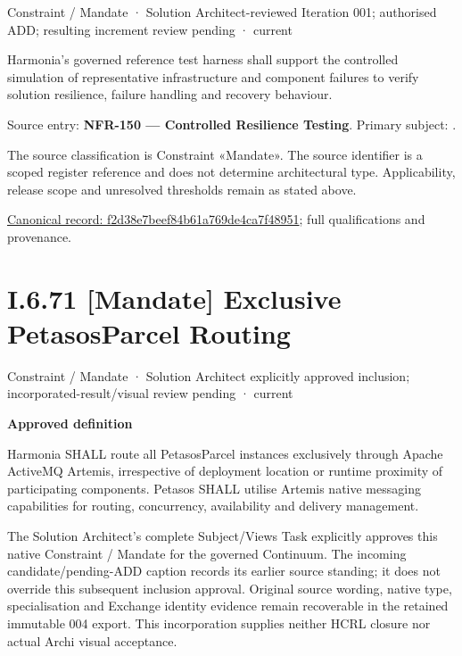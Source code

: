 \label{element:f2d38e7beef84b61a769de4ca7f48951}
{\small Constraint / Mandate · Solution Architect-reviewed Iteration 001; authorised ADD; resulting increment review pending · current}\par

Harmonia's governed reference test harness shall support the controlled simulation of representative infrastructure and component failures to verify solution resilience, failure handling and recovery behaviour.



Source entry: \textbf{NFR-150 — Controlled Resilience Testing}. Primary subject: \texttt{}.



The source classification is Constraint «Mandate». The source identifier is a scoped register reference and does not determine architectural type. Applicability, release scope and unresolved thresholds remain as stated above.


{\footnotesize \href{../../../../../../../continuum/motivation/constraint/mandate/f2d38e7beef84b61a769de4ca7f48951.md}{Canonical record: f2d38e7beef84b61a769de4ca7f48951}; full qualifications and provenance.}\par
\section*{I.6.71 [Mandate] Exclusive PetasosParcel Routing}
\label{navigation:I.6.71}

\label{element:e024703b32c5437481ce290e8e50b079}
{\small Constraint / Mandate · Solution Architect explicitly approved inclusion; incorporated-result/visual review pending · current}\par

\par\medskip\textbf{Approved definition}\par


Harmonia SHALL route all PetasosParcel instances exclusively through Apache ActiveMQ Artemis, irrespective of deployment location or runtime proximity of participating components. Petasos SHALL utilise Artemis native messaging capabilities for routing, concurrency, availability and delivery management.



The Solution Architect's complete Subject/Views Task explicitly approves this
native Constraint / Mandate for the governed Continuum.
The incoming candidate/pending-ADD caption records its earlier source standing;
it does not override this subsequent inclusion approval. Original source wording,
native type, specialisation and Exchange identity evidence remain recoverable in
the retained immutable 004 export. This incorporation supplies neither HCRL closure
nor actual Archi visual acceptance.



